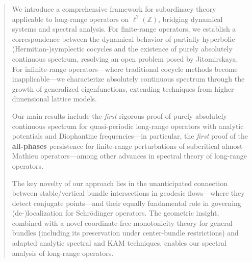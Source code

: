 \documentclass[11pt]{amsart}
\theoremstyle{remark}
\theoremstyle{definition}
\begin{document}
\begin{abstract}
We introduce a comprehensive framework for subordinacy theory applicable to long-range operators on $\ell^2(\mathbb{Z})$, bridging dynamical systems and spectral analysis. For finite-range operators, we establish a correspondence between the dynamical behavior of partially hyperbolic (Hermitian-)symplectic cocycles and the existence of purely absolutely continuous spectrum, resolving an open problem posed by Jitomirskaya. For infinite-range operators—where traditional cocycle methods become inapplicable—we characterize absolutely continuous spectrum through the growth of generalized eigenfunctions, extending techniques from higher-dimensional lattice models.


Our main results include the \textit{first} rigorous proof of purely absolutely continuous spectrum for quasi-periodic long-range operators with analytic potentials and Diophantine frequencies—in particular, the \textit{first} proof of the \textbf{all-phases} persistence for finite-range perturbations of subcritical almost Mathieu operators—among other advances in spectral theory of long-range operators.

The key novelty of our approach lies in the unanticipated connection between stable/vertical bundle intersections in geodesic flows—where they detect conjugate points—and their equally fundamental role in governing (de-)localization for Schrödinger operators. The geometric insight, combined with a novel coordinate-free monotonicity theory for general bundles (including its preservation under center-bundle restrictions) and adapted analytic spectral and KAM techniques, enables our spectral analysis of long-range operators.



\end{abstract}
\end{document}
